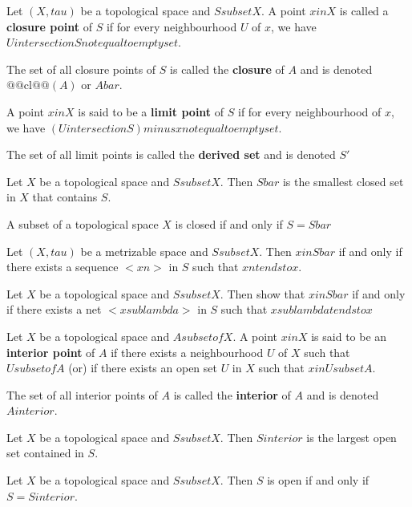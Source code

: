\begin{defn}
    Let $(X, tau)$ be a topological space and $S subset X$. A point $x in X$ is called a \textbf{closure point} of $S$ if for every neighbourhood $U$ of $x$, we have $U intersection S not equal to empty set$.

    The set of all closure points of $S$ is called the \textbf{closure} of $A$ and is denoted $@@\text{cl}@@(A)$ or $A bar$.
\end{defn}

\begin{defn}
    A point $x in X$ is said to be a \textbf{limit point} of $S$ if for every neighbourhood of $x$, we have $(U intersection S) minus {{ x }} not equal to empty set $.

    The set of all limit points is called the \textbf{derived set} and is denoted $S'$
\end{defn}

\begin{thm}
    Let $X$ be a topological space and $S subset X$. Then $S bar$ is the smallest closed set in $X$ that contains $S$.
\end{thm}

\begin{prop}
    A subset of a topological space $X$ is closed if and only if $S = S bar$
\end{prop}

\begin{thm}
    Let $(X, tau)$ be a metrizable space and $S subset X$. Then $x in S bar$ if and only if there exists a sequence $<xn>$ in $S$ such that $xn tends to x$.
\end{thm}

\begin{thm}
    Let $X$ be a topological space and $S subset X$. Then show that $x in S bar$ if and only if there exists a net $< x sub lambda >$ in $S$ such that $ x sub lambda tends to x$
\end{thm}

\begin{defn}
        Let $X$ be a topological space and $A subset of X$. A point $x in X$ is said to be an \textbf{interior point} of $A$ if there exists a neighbourhood $U$ of $X$ such that $U subset of A$ (or) if there exists an open set $U$ in $X$ such that $x in U subset A$.

        The set of all interior points of $A$ is called the \textbf{interior} of $A$ and is denoted $A interior$.
\end{defn}

\begin{thm}
    Let $X$ be a topological space and $S subset X$. Then $S interior$ is the largest open set contained in $S$.
\end{thm}

\begin{thm}
    Let $X$ be a topological space and $S subset X$. Then $S$ is open if and only if $S = S interior$.
\end{thm}

\hhrule 
